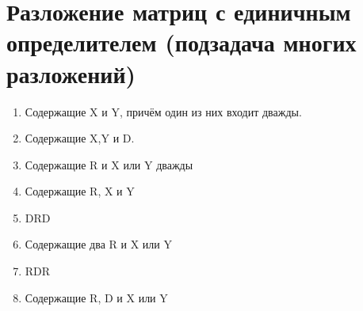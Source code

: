 \section{Разложение матриц с единичным определителем (подзадача многих разложений)}

\begin{enumerate}
	\item Содержащие X и Y, причём один из них входит дважды.
	\item Содержащие X,Y и D.
	\item Содержащие R и X или Y дважды
	\item Содержащие R, X и Y
	\item DRD
	\item Содержащие два R и X или Y
	\item RDR
	\item Содержащие R, D и X или Y
\end{enumerate}

